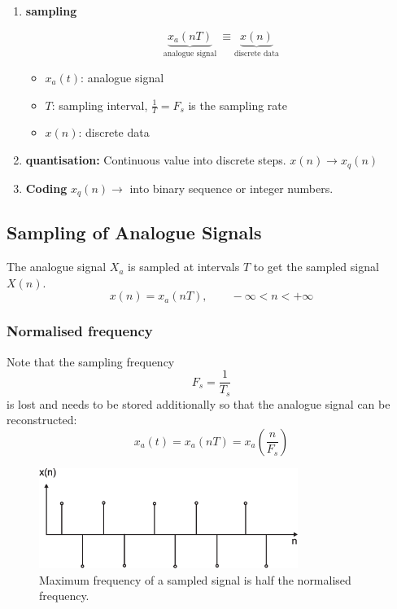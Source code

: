 \documentclass[12pt,a4paper]{article}
\begin{document}
\begin{enumerate}

\item {\bf sampling}

\begin{equation}
\underbrace{x_{a}(nT)}_{\mbox{analogue signal}}~ \equiv \underbrace{x(n)}_{\mbox{discrete data}}
\end{equation}

\begin{itemize}
\item $x_a(t)$: analogue signal
\item $T$: sampling interval, $\frac{1}{T}=F_s$ is the sampling rate
\item $x(n)$: discrete data
\end{itemize}

\item {\bf quantisation:} 
Continuous value into discrete steps. $x(n) \rightarrow x_{q}(n)$

\item {\bf Coding}
$x_{q}(n) \rightarrow$  into binary sequence or integer numbers.
\end{enumerate}


\subsection{Sampling of Analogue Signals}
The analogue signal $X_a$ is sampled at intervals $T$ to get
the sampled signal $X(n)$.
\begin{equation}
x(n) = x_{a}(nT),  \qquad -\infty < n < +\infty
\end{equation}

\subsubsection{Normalised frequency}
Note that the sampling frequency
\begin{equation}
F_{s} = \frac{1}{T_s}
\end{equation}
is lost and needs to be stored additionally so that the analogue
signal can be reconstructed:
\begin{equation}
x_{a}(t) = x_{a}(nT) = x_{a}(\frac{n}{F_{s}})
\end{equation}

\begin{figure}[!hbt]
\begin{center}
\mbox{\includegraphics[width=0.75\textwidth]{max_sampl}}
\end{center}
\caption{Maximum frequency of a sampled signal is half the
normalised frequency.
\label{max_sampl}}
\end{figure}
\end{document}
